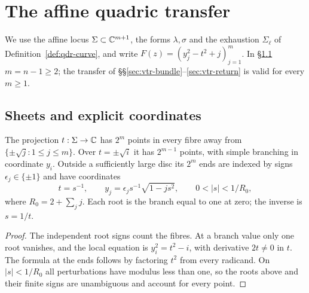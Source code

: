 \section{The affine quadric transfer}\label{sec:vtr}

We use the affine locus $\Sigma\subset\mathbb{C}^{m+1}$, the forms $\lambda,\sigma$ and the exhaustion $\Sigma_\ell$ of
Definition~\ref{def:qdr-curve}, and write $F(z)=(y_j^2-t^2+j)_{j=1}^m$. In \S\ref{sec:vtr-curve}
$m=n-1\ge2$; the transfer of \S\S\ref{sec:vtr-bundle}--\ref{sec:vtr-return} is valid for every $m\ge1$.

\subsection{Sheets and explicit coordinates}\label{sec:vtr-curve}

\begin{lemma}\label{lem:vtr-square}
The projection $t:\Sigma\to\mathbb{C}$ has $2^m$ points in every fibre away from $\{\pm\sqrt j:1\le j\le m\}$.
Over $t=\pm\sqrt i$ it has $2^{m-1}$ points, with simple branching in coordinate $y_i$.
Outside a sufficiently large disc its $2^m$ ends are indexed by signs $\epsilon_j\in\{\pm1\}$ and have coordinates
\[
 t=s^{-1},\qquad y_j=\epsilon_j s^{-1}\sqrt{1-js^2},\qquad 0<|s|<1/R_0,
\]
where $R_0=2+\sum_jj$. Each root is the branch equal to one at zero; the inverse is $s=1/t$.
\end{lemma}

\begin{proof}
The independent root signs count the fibres. At a branch value only one root vanishes, and the local equation is
$y_i^2=t^2-i$, with derivative $2t\ne0$ in $t$. The formula at the ends follows by factoring $t^2$ from every
radicand. On $|s|<1/R_0$ all perturbations have modulus less than one, so the roots above and their finite signs
are unambiguous and account for every point.
\end{proof}


